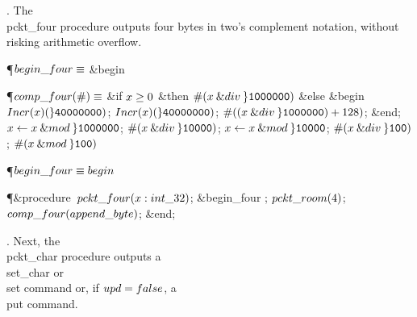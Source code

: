 . The \\{pckt\_four} procedure outputs four bytes in two's complement
notation, without risking arithmetic overflow.

\Y\P\D $\\{begin\_four}\S$ \6
\&{begin} \par
\P\D {}$\\{comp\_four}(\#)\S$\1\6
\&{if} $\|x\G0$ \1\&{then}\5
$\#(\|x\mathbin{\&{div}}\H{1000000})$\6
\4\&{else} \&{begin} $\\{Incr}(\|x)(\H{40000000})$;\5
$\\{Incr}(\|x)(\H{40000000})$;\5
$\#((\|x\mathbin{\&{div}}\H{1000000})+128)$;\6
\&{end};\2\2\6
$\|x\K\|x\mathbin{\&{mod}}\H{1000000}$;\5
$\#(\|x\mathbin{\&{div}}\H{10000})$;\5
$\|x\K\|x\mathbin{\&{mod}}\H{10000}$;\5
$\#(\|x\mathbin{\&{div}}\H{100})$;\5
$\#(\|x\mathbin{\&{mod}}\H{100})$\par
\P\F {}$\\{begin\_four}\S\\{begin}$\par
\Y\P\4\&{procedure}\1\  $\\{pckt\_four}(\|x:\\{int\_32})$;\2\6
\&{begin\_four} ;\5
$\\{pckt\_room}(4)$;\5
$\\{comp\_four}(\\{append\_byte})$;\6
\&{end};\par
\fi

. Next, the \\{pckt\_char} procedure outputs a \\{set\_char} or \\{set}
command
or, if $\\{upd}=\\{false}$, a \\{put} command.


